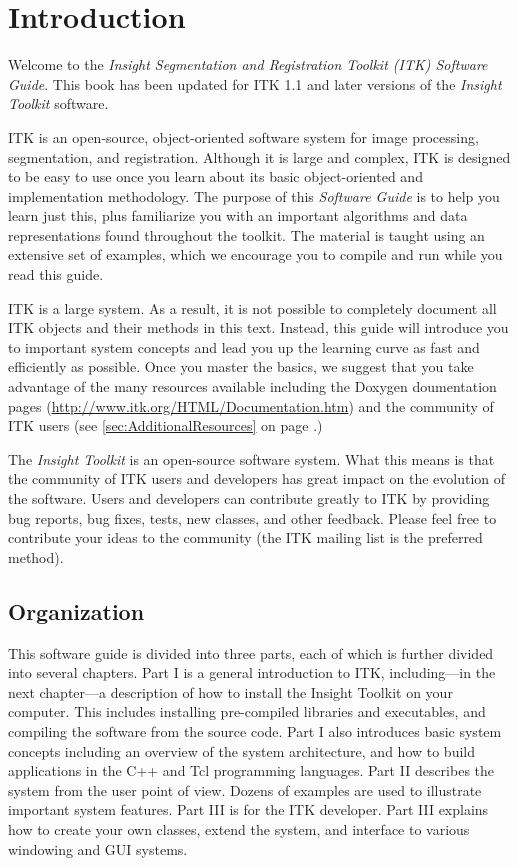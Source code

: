\chapter{Introduction}
\label{chapter:Introduction}

Welcome to the \emph{Insight Segmentation and Registration Toolkit (ITK)
Software Guide}. This book has been updated for ITK 1.1 and later versions of
the \emph{Insight Toolkit} software.

ITK is an open-source, object-oriented software system for image processing,
segmentation, and registration.  Although it is large and complex, ITK is
designed to be easy to use once you learn about its basic object-oriented and
implementation methodology. The purpose of this \emph{Software Guide} is
to help you learn just this, plus familiarize you with an important
algorithms and data representations found throughout the toolkit. The material
is taught using an extensive set of examples, which we encourage you to compile
and run while you read this guide.

ITK is a large system. As a result, it is not possible to completely document
all ITK objects and their methods in this text. Instead, this guide will
introduce you to important system concepts and lead you up the learning curve
as fast and efficiently as possible. Once you master the basics, we suggest
that you take advantage of the many resources available including the Doxygen
doumentation pages (\url{http://www.itk.org/HTML/Documentation.htm}) and
the community of ITK users (see \ref{sec:AdditionalResources} on page 
\pageref{sec:AdditionalResources}.)

The \emph{Insight Toolkit} is an open-source software system. What this means
is that the community of ITK users and developers has great impact on the
evolution of the software. Users and developers can contribute greatly to ITK
by providing bug reports, bug fixes, tests, new classes, and other
feedback. Please feel free to contribute your ideas to the community (the ITK
mailing list is the preferred method).

\section{Organization}
\label{sec:Organization}

This software guide is divided into three parts, each of which is further
divided into several chapters. Part I is a general introduction to ITK,
including---in the next chapter---a description of how to install the Insight
Toolkit on your computer. This includes installing pre-compiled libraries and
executables, and compiling the software from the source code. Part I also
introduces basic system concepts including an overview of the system
architecture, and how to build applications in the C++ and Tcl programming
languages. Part II describes the system from the user point of view. Dozens
of examples are used to illustrate important system features. Part III is for
the ITK developer. Part III explains how to create your own classes, extend
the system, and interface to various windowing and GUI systems.

